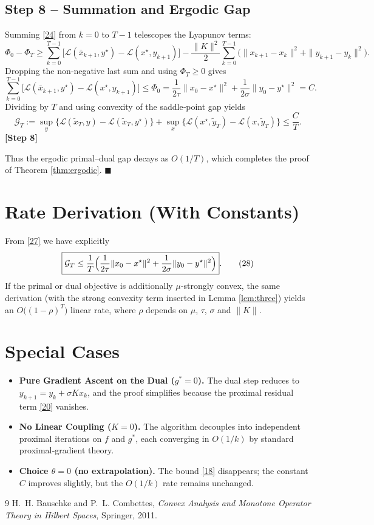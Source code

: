 \documentclass[11pt]{article}
\begin{document}
\subsection*{Step 8 – Summation and Ergodic Gap}
Summing \eqref{24} from $k=0$ to $T-1$ telescopes the Lyapunov terms:
\[
\Phi_{0}-\Phi_{T}\ge
\sum_{k=0}^{T-1}\bigl[\mathcal{L}(\bar{x}_{k+1},y^{\star})
                     -\mathcal{L}(x^{\star},y_{k+1})\bigr]
-\frac{\|K\|^{2}}{2}\sum_{k=0}^{T-1}
   \bigl(\|x_{k+1}-x_{k}\|^{2}+\|y_{k+1}-y_{k}\|^{2}\bigr).
\tag{25}
\]
Dropping the non‑negative last sum and using $\Phi_{T}\ge0$ gives
\[
\sum_{k=0}^{T-1}\bigl[\mathcal{L}(\bar{x}_{k+1},y^{\star})
                     -\mathcal{L}(x^{\star},y_{k+1})\bigr]
\le\Phi_{0}
= \frac{1}{2\tau}\|x_{0}-x^{\star}\|^{2}
  +\frac{1}{2\sigma}\|y_{0}-y^{\star}\|^{2}=C.
\tag{26}
\]
Dividing by $T$ and using convexity of the saddle‑point gap yields
\[
\mathcal{G}_{T}
:=\sup_{y}\bigl\{\mathcal{L}(\tilde{x}_{T},y)-\mathcal{L}(\tilde{x}_{T},y^{\star})\bigr\}
 +\sup_{x}\bigl\{\mathcal{L}(x^{\star},\tilde{y}_{T})-\mathcal{L}(x,\tilde{y}_{T})\bigr\}
\le \frac{C}{T}.
\tag{27}
\]
\textbf{[Step 8]}

Thus the ergodic primal–dual gap decays as $O(1/T)$, which completes the proof of Theorem \ref{thm:ergodic}. \hfill $\blacksquare$

\section*{Rate Derivation (With Constants)}
From \eqref{27} we have explicitly
\[
\boxed{
\mathcal{G}_{T}\le
\frac{1}{T}\Bigl(\frac{1}{2\tau}\|x_{0}-x^{\star}\|^{2}
               +\frac{1}{2\sigma}\|y_{0}-y^{\star}\|^{2}\Bigr)}.
\tag{28}
\]
If the primal or dual objective is additionally $\mu$‑strongly convex, the same derivation (with the strong convexity term inserted in Lemma \ref{lem:three}) yields an $O\!\bigl((1-\rho)^{T}\bigr)$ linear rate, where $\rho$ depends on $\mu$, $\tau$, $\sigma$ and $\|K\|$.

\section*{Special Cases}
\begin{itemize}
\item \textbf{Pure Gradient Ascent on the Dual ($g^{*}=0$).}
   The dual step reduces to $y_{k+1}=y_{k}+\sigma Kx_{k}$, and the proof simplifies because the proximal residual term \eqref{20} vanishes.
\item \textbf{No Linear Coupling ($K=0$).}
   The algorithm decouples into independent proximal iterations on $f$ and $g^{*}$, each converging in $O(1/k)$ by standard proximal‑gradient theory.
\item \textbf{Choice $\theta=0$ (no extrapolation).}
   The bound \eqref{18} disappears; the constant $C$ improves slightly, but the $O(1/k)$ rate remains unchanged.
\end{itemize}

\begin{thebibliography}{9}
H.~H. Bauschke and P.~L. Combettes,
\textit{Convex Analysis and Monotone Operator Theory in Hilbert Spaces},
Springer, 2011.
\end{thebibliography}
\end{document}
